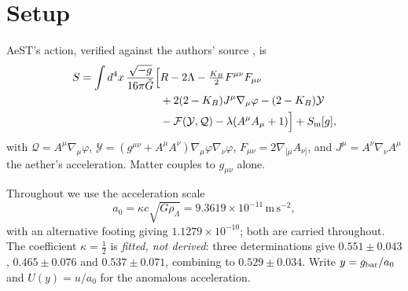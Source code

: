 \documentclass[aps,prd,twocolumn,10pt,nofootinbib,superscriptaddress]{revtex4-2}
\newcommand{\FF}{\mathcal{F}}
\newcommand{\YY}{\mathcal{Y}}
\newcommand{\QQ}{\mathcal{Q}}
\newcommand{\Gt}{\tilde{G}}
\begin{document}
\begin{abstract}
cosmological and local gravitational constants. Rescaling, $\mathcal{J}\to s\mathcal{J}$, cures
the ghost at every acceleration for $s<K_B/(2-K_B)$ --- and forces $\Gt/G_N\le0.121$, giving a primordial helium
abundance $Y_p=0.086$ against an observed $0.2449\pm0.0040$ ($-42\sigma$) and a gravitational
radiation density \emph{below that of the photons alone}. Gravitational waves do not pay this
price: the standard-siren amplitude's sensitivity is exactly zero. We also record a structural identity: AeST's action
already contains an explicit $+(2-K_B)a^\mu a_\mu$, so its apparent $c_4=0$ is an artifact of
variables; and $c_T=1$ holds exactly, for any free function. Finally we derive the $a_0$-line's
AQUAL free function in closed form and show its deep-MOND limit is exactly $\tfrac23z^{3/2}$,
matching AeST's own MOND term with no free constant, and identify a single-argument ansatz whose
quasi-static argument is $X=-\Psi\QQ_0-\YY/2m$ --- containing the Newtonian potential directly,
and so satisfying R1 by construction.
\end{abstract}

\maketitle

\section{Setup}

AeST's action, verified against the authors' source \cite{SZ2021,SZ2022}, is
\begin{align}
S=\int d^4x\,\frac{\sqrt{-g}}{16\pi\Gt}\Big[&R-2\Lambda-\tfrac{K_B}{2}F^{\mu\nu}F_{\mu\nu}
\nonumber\\
&+2(2-K_B)J^\mu\nabla_\mu\varphi-(2-K_B)\YY \nonumber\\
&-\FF(\YY,\QQ)-\lambda(A^\mu A_\mu+1)\Big]+S_{\rm m}[g],
\label{eq:action}
\end{align}
with $\QQ=A^\mu\nabla_\mu\varphi$, $\YY=(g^{\mu\nu}+A^\mu A^\nu)\nabla_\mu\varphi\nabla_\nu\varphi$,
$F_{\mu\nu}=2\nabla_{[\mu}A_{\nu]}$, and $J^\mu=A^\nu\nabla_\nu A^\mu$ the aether's acceleration.
Matter couples to $g_{\mu\nu}$ alone.

Throughout we use the acceleration scale
\begin{equation}
a_0=\kappa c\sqrt{G\rho_\Lambda}=9.3619\times10^{-11}\,\mathrm{m\,s^{-2}},
\label{eq:a0}
\end{equation}
with an alternative footing giving $1.1279\times10^{-10}$; both are carried throughout. The
coefficient $\kappa=\tfrac12$ is \emph{fitted, not derived}: three determinations give
$0.551\pm0.043$, $0.465\pm0.076$ and $0.537\pm0.071$, combining to $0.529\pm0.034$. Write
$y=g_{\rm bar}/a_0$ and $U(y)=u/a_0$ for the anomalous acceleration.
\end{document}

